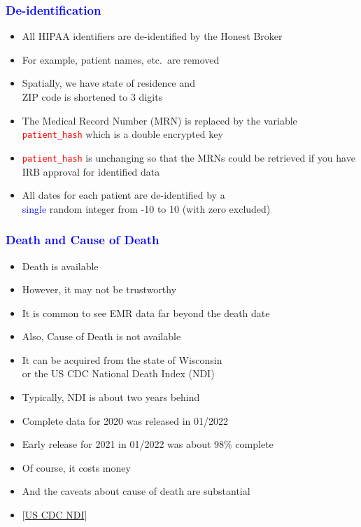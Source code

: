 \documentclass[11pt,pdftex,dvipsnames,usenames]{beamer}
\begin{document}
\begin{frame}[fragile]\frametitle{\bf\textcolor{blue}{De-identification}}

\begin{itemize}
\item All HIPAA identifiers are de-identified by the Honest Broker
\item For example, patient names, etc.\ are removed
\item Spatially, we have state of residence and\\
ZIP code is shortened to 3 digits 
\item The Medical Record Number (MRN) is replaced by
the variable \textcolor{red}{\texttt{patient\_hash}} which is a double
encrypted key 
\item \textcolor{red}{\texttt{patient\_hash}} is unchanging so that
the MRNs could be retrieved if you have IRB approval for identified
data
\item All dates for each patient are de-identified by a\\
\textcolor{blue}{single} random integer from -10 to 10 (with zero excluded)

\end{itemize}

\end{frame}

\begin{frame}[fragile]\frametitle{\bf\textcolor{blue}{Death and Cause
      of Death}}

\begin{itemize}
\item Death is available
\item However, it may not be trustworthy
\item It is common to see EMR data far beyond the death date
\item Also, Cause of Death is not available
\item It can be acquired from the state of Wisconsin\\
or the US CDC National Death Index (NDI)
\item Typically, NDI is about two years behind
\item Complete data for 2020 was released in 01/2022
\item Early release for 2021 in 01/2022 was about 98\% complete 
\item Of course, it costs money
\item And the caveats about cause of death are substantial
\item \textcolor{PineGreen}{[\href{https://www.cdc.gov/nchs/ndi/index.htm}
{US CDC NDI}]}
\end{itemize}

\end{frame}
\end{document}

